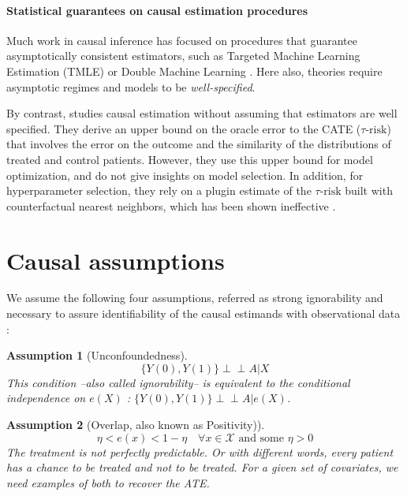 \documentclass[11pt]{article}
\let\cite=\supercite
\newcommand{\indep}{\perp \!\!\! \perp}
\newtheorem{assumption}{Assumption}
\begin{document}
\paragraph{Statistical guarantees on causal estimation procedures}

Much work in causal inference has focused on procedures that
guarantee asymptotically consistent estimators, such as Targeted
Machine Learning
Estimation (TMLE) \cite{laan_targeted_2011,schuler_targeted_2017} or
Double Machine Learning \cite{chernozhukov_double_2018}. Here also, theories require asymptotic regimes and
models to be \textit{well-specified}.

By contrast, \citet{johansson2022generalization} studies causal estimation
without assuming that estimators are well specified. They derive an upper bound
on the oracle error to the CATE ($\tau\text{-risk}$) that involves the error on
the outcome and the similarity of the distributions of treated and control
patients. However, they use this upper bound for model optimization,
and do not give insights on model selection. In addition, for hyperparameter
selection, they rely on a plugin estimate of the $\tau\text{-risk}$ built with
counterfactual nearest neighbors, which has been shown ineffective
\cite{schuler_comparison_2018}.


\section{Causal assumptions}\label{apd:causal_assumptions}

We assume the following four assumptions, referred as strong ignorability and
necessary to assure identifiability of the causal estimands with observational
data \cite{rubin_causal_2005}:
\begin{assumption}[Unconfoundedness]\label{assumption:ignorability}
    \begin{equation*}\label{eq:ignorability}
        \{Y(0), Y(1) \} \indep A | X
    \end{equation*}
    This condition --also called ignorability-- is equivalent to the conditional
    independence on $e(X)$ \cite{rosenbaum_central_1983}: $\{Y(0), Y(1) \}
        \indep  A | e(X)$.
\end{assumption}


\begin{assumption}[Overlap, also known as Positivity)]\label{assumption:overlap}
    \begin{equation*}\label{eq:overlap}
        \eta < e(x) < 1 - \eta \quad \forall x \in \mathcal X \text{ and some } \eta > 0
    \end{equation*}
    The treatment is not perfectly predictable. Or with different words, every
    patient has a chance to be treated and not to be treated. For a given set of
    covariates, we need examples of both to recover the ATE.
\end{assumption}
\end{document}
